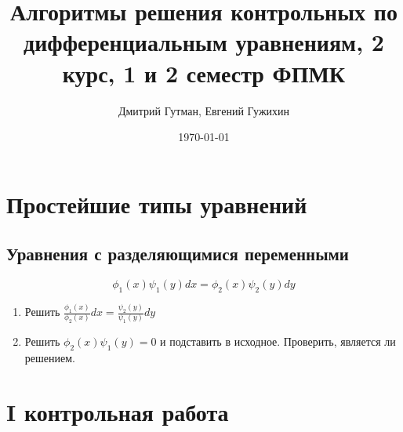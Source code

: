 \documentclass[a5paper,10pt]{article}
\author{Дмитрий Гутман, Евгений Гужихин}
\title{Алгоритмы решения контрольных по дифференциальным уравнениям, 2 курс, 1 и 2 семестр ФПМК}
\date{\today}
\begin{document}
	\maketitle

	\tableofcontents{}
	\newpage

	\section{Простейшие типы уравнений}
		\subsection{Уравнения с разделяющимися переменными}
			\label{SeparatingVariables}
			$$ \phi_{1}(x)\psi_1(y)dx=\phi_2(x)\psi_2(y)dy $$
			\begin{enumerate}
				\item Решить $ \frac{\phi_1(x)}{\phi_2(x)}dx = \frac{\psi_2(y)}{\psi_1(y)}dy $
				\item Решить $ \phi_2(x)\psi_1(y) = 0 $ и подставить в исходное. Проверить, является ли решением.
			\end{enumerate}

	\section{I контрольная работа}
\end{document}
